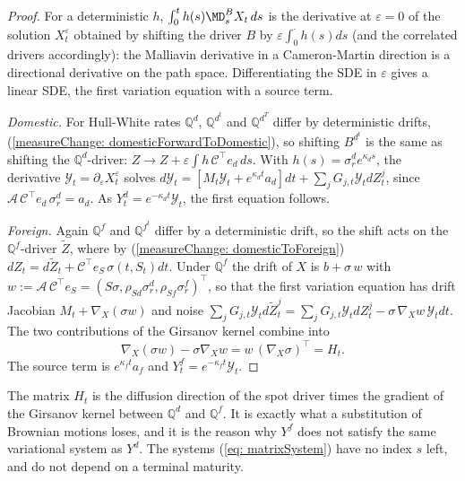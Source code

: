\begin{proof}
For a deterministic $h$, $\int_0^th(s)\MD^{B}_sX_t\,ds$ is the derivative at $\varepsilon=0$ of the solution $X^\varepsilon_t$ obtained by shifting the driver $B$ by $\varepsilon\int_0^\cdot h(s)ds$ (and the correlated drivers accordingly): the Malliavin derivative in a Cameron-Martin direction is a directional derivative on the path space. Differentiating the SDE in $\varepsilon$ gives a linear SDE, the first variation equation with a source term.

\textit{Domestic.} For Hull-White rates $\mathbb{Q}^d$, $\mathbb{Q}^{d^t}$ and $\mathbb{Q}^{d^T}$ differ by deterministic drifts, (\ref{measureChange: domesticForwardToDomestic}), so shifting $B^{d^t}$ is the same as shifting the $\mathbb{Q}^d$-driver: $Z\to Z+\varepsilon\int h\,\mathcal{C}^\top e_d\,ds$. With $h(s)=\sigma^d_re^{\kappa_ds}$, the derivative $\mathcal{Y}_t=\partial_\varepsilon X^\varepsilon_t$ solves $d\mathcal{Y}_t=[M_t\mathcal{Y}_t+e^{\kappa_dt}a_d]dt+\sum_jG_{j,t}\mathcal{Y}_tdZ^j_t$, since $\mathcal{A}\,\mathcal{C}^\top e_d\,\sigma^d_r=a_d$. As $Y^d_t=e^{-\kappa_dt}\mathcal{Y}_t$, the first equation follows.

\textit{Foreign.} Again $\mathbb{Q}^f$ and $\mathbb{Q}^{f^t}$ differ by a deterministic drift, so the shift acts on the $\mathbb{Q}^f$-driver $\widetilde{Z}$, where by (\ref{measureChange: domesticToForeign}) $dZ_t=d\widetilde{Z}_t+\mathcal{C}^\top e_S\,\sigma(t,S_t)dt$. Under $\mathbb{Q}^f$ the drift of $X$ is $b+\sigma\,w$ with $w:=\mathcal{A}\,\mathcal{C}^\top e_S=(S\sigma,\rho_{Sd}\sigma^d_r,\rho_{Sf}\sigma^f_r)^\top$, so that the first variation equation has drift Jacobian $M_t+\nabla_X(\sigma w)$ and noise $\sum_jG_{j,t}\mathcal{Y}_td\widetilde{Z}^j_t=\sum_jG_{j,t}\mathcal{Y}_tdZ^j_t-\sigma\,\nabla_Xw\,\mathcal{Y}_tdt$. The two contributions of the Girsanov kernel combine into
$$ \nabla_X(\sigma w)-\sigma\nabla_Xw=w\,(\nabla_X\sigma)^\top=H_t . $$
The source term is $e^{\kappa_ft}a_f$ and $Y^f_t=e^{-\kappa_ft}\mathcal{Y}_t$.
\end{proof}
The matrix $H_t$ is the diffusion direction of the spot driver times the gradient of the Girsanov kernel between $\mathbb{Q}^d$ and $\mathbb{Q}^f$. It is exactly what a substitution of Brownian motions loses, and it is the reason why $Y^f$ does not satisfy the same variational system as $Y^d$. The systems (\ref{eq: matrixSystem}) have no index $s$ left, and do not depend on a terminal maturity.

